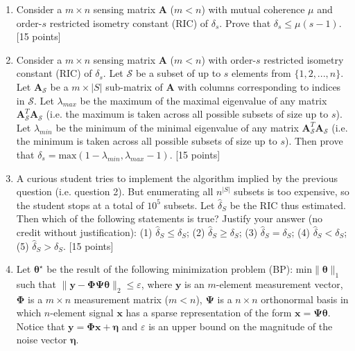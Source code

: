 \documentclass[11pt]{article}
\begin{document}
\begin{enumerate}
\item Consider a $m \times n$ sensing matrix $\boldsymbol{A}$ ($m < n$)  with mutual coherence $\mu$ and order-$s$ restricted isometry constant (RIC) of $\delta_s$. Prove that $\delta_s \leq \mu(s-1)$. \textsf{[15 points]}

\item Consider a $m \times n$ sensing matrix $\boldsymbol{A}$ ($m < n$) with order-$s$ restricted isometry constant (RIC) of $\delta_s$. Let $\mathcal{S}$ be a subset of up to $s$ elements from $\{1,2,...,n\}$. Let $\boldsymbol{A}_{\mathcal{S}}$ be a $m  \times |S|$ sub-matrix of $\boldsymbol{A}$ with columns corresponding to indices in $\mathcal{S}$. Let $\lambda_{max}$ be the maximum of the maximal eigenvalue of any matrix $\boldsymbol{A}^T_{\mathcal{S}} \boldsymbol{A}_{\mathcal{S}}$ (i.e. the maximum is taken across all possible subsets of size up to $s$). Let $\lambda_{min}$ be the minimum of the minimal eigenvalue of any matrix $\boldsymbol{A}^T_{\mathcal{S}} \boldsymbol{A}_{\mathcal{S}}$ (i.e. the minimum is taken across all possible subsets of size up to $s$). Then prove that $\delta_s = \textrm{max}(1-\lambda_{min},\lambda_{max}-1)$. \textsf{[15 points]}

\item A curious student tries to implement the algorithm implied by the previous question (i.e. question 2). But enumerating all $n^{|S|}$ subsets is too expensive, so the student stops at a total of $10^5$ subsets. Let $\hat{\delta}_S$ be the RIC thus estimated. Then which of the following statements is true? Justify your answer (no credit without justification): (1) $\hat{\delta}_S \leq \delta_S$; (2) $\hat{\delta}_S \geq \delta_S$; (3) $\hat{\delta}_S = \delta_S$; (4) $\hat{\delta}_S < \delta_S$; (5) $\hat{\delta}_S > \delta_S$. \textsf{[15 points]}

\item Let $\boldsymbol{\theta^{\star}}$ be the result of the following minimization problem (BP): $\textrm{min} \|\boldsymbol{\theta}\|_1$ such that $\|\boldsymbol{y}-\boldsymbol{\Phi \Psi \theta}\|_2 \leq \varepsilon$, where $\boldsymbol{y}$ is an $m$-element measurement vector, $\boldsymbol{\Phi}$ is a $m \times n$ measurement matrix ($m < n$), $\boldsymbol{\Psi}$ is a $n \times n$ orthonormal basis in which $n$-element signal $\boldsymbol{x}$ has a sparse representation of the form $\boldsymbol{x} = \boldsymbol{\Psi \theta}$. Notice that $\boldsymbol{y} = \boldsymbol{\Phi x} + \boldsymbol{\eta}$ and $\varepsilon$ is an upper bound on the magnitude of the noise vector $\boldsymbol{\eta}$.


\end{enumerate}
\end{document}
